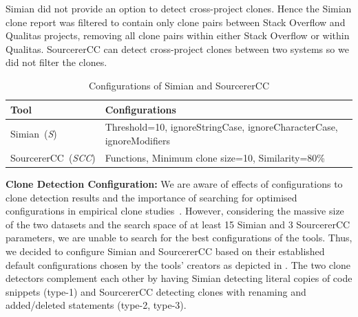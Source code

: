 \documentclass[10pt,journal,compsoc]{IEEEtran}
\begin{document}
Simian did not provide an option to detect cross-project clones. Hence the
Simian clone report was filtered to contain only clone pairs between Stack
Overflow and Qualitas projects, removing all clone pairs within either Stack
Overflow or within Qualitas. 
SourcererCC can detect cross-project clones between two systems so we did
not filter the clones.

\begin{table}
	\centering
	\caption{Configurations of Simian and SourcererCC}
	\label{tab:clone_config}
	\begin{tabular}{lp{5cm}}
		\toprule
		Tool & Configurations \\
		\midrule
		Simian~(\textit{S}) &  Threshold=10, ignoreStringCase, \newline ignoreCharacterCase, \newline ignoreModifiers \\ 
		\midrule
		SourcererCC~(\textit{SCC}) & Functions, Minimum clone size=10, \newline Similarity=80\% \\
		\bottomrule
	\end{tabular} %
\end{table}

\textbf{Clone Detection Configuration: } We are aware of effects of
configurations to clone detection results and the importance of searching for
optimised configurations in empirical clone
studies~\cite{Svajlenko2014,Wang2014,cr2016ssbse,Ragkhitwetsagul2016, emse}. However,
considering the massive size of the two datasets and the search space of at
least 15 Simian and 3 SourcererCC parameters, we are unable to search for the
best configurations of the tools. Thus, we decided to configure Simian and
SourcererCC based on their established default configurations chosen by the
tools' creators as depicted in . 
The two clone detectors complement each
other by having Simian detecting literal copies of code snippets (type-1) and SourcererCC
detecting clones with renaming and added/deleted statements (type-2, type-3). 
\end{document}
